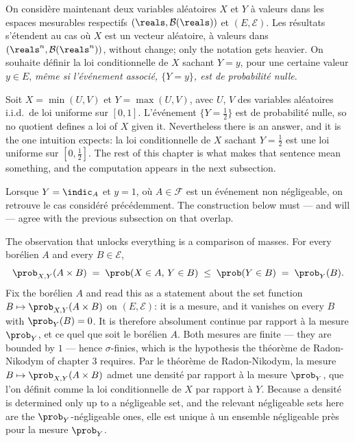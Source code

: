 On considère maintenant deux variables aléatoires $X$ et $Y$ à valeurs dans les
espaces mesurables respectifs $(\reals,\mathcal{B}(\reals))$ et $(E,\mathcal{E})$.
Les résultats s'étendent au cas où $X$ est un vecteur aléatoire, à valeurs dans
$(\reals^{n},\mathcal{B}(\reals^{n}))$, without change; only the notation gets
heavier. On souhaite définir la loi conditionnelle de $X$ sachant $Y = y$, pour une
certaine valeur $y \in E$, \emph{même si l'événement associé, $\{Y = y\}$, est de
probabilité nulle}.

\begin{example}
  Soit $X = \min(U,V)$ et $Y = \max(U,V)$, avec $U$, $V$ des variables aléatoires
  i.i.d.\ de loi uniforme sur $[0,1]$. L'événement $\{Y = \tfrac{1}{2}\}$ est de
  probabilité nulle, so no quotient defines a loi of $X$ given it. Nevertheless
  there is an answer, and it is the one intuition expects: la loi conditionnelle de
  $X$ sachant $Y = \tfrac{1}{2}$ est une loi uniforme sur $[0,\tfrac{1}{2}]$. The
  rest of this chapter is what makes that sentence mean something, and the
  computation appears in the next subsection.
\end{example}

\begin{remark}
  Lorsque $Y = \indic_{A}$ et $y = 1$, où $A \in \mathcal{F}$ est un événement non
  négligeable, on retrouve le cas considéré précédemment. The construction below
  must --- and will --- agree with the previous subsection on that overlap.
\end{remark}

The observation that unlocks everything is a comparison of masses. For every
borélien $A$ and every $B \in \mathcal{E}$,
\[
  \prob_{X,Y}(A \times B) \;=\; \prob(X \in A, \, Y \in B)
  \;\leq\; \prob(Y \in B) \;=\; \prob_{Y}(B) .
\]
Fix the borélien $A$ and read this as a statement about the set function
$B \mapsto \prob_{X,Y}(A \times B)$ on $(E,\mathcal{E})$: it is a mesure, and it
vanishes on every $B$ with $\prob_{Y}(B) = 0$. It is therefore absolument continue
par rapport à la mesure $\prob_{Y}$, et ce quel que soit le borélien $A$. Both
mesures are finite --- they are bounded by $1$ --- hence $\sigma$-finies, which is
the hypothesis the théorème de Radon-Nikodym of chapter 3 requires. Par le théorème
de Radon-Nikodym, la mesure $B \mapsto \prob_{X,Y}(A \times B)$ admet une densité
par rapport à la mesure $\prob_{Y}$, que l'on définit comme la loi conditionnelle de
$X$ par rapport à $Y$. Because a densité is determined only up to a négligeable
set, and the relevant négligeable sets here are the $\prob_{Y}$-négligeable ones,
elle est unique à un ensemble négligeable près pour la mesure $\prob_{Y}$.

